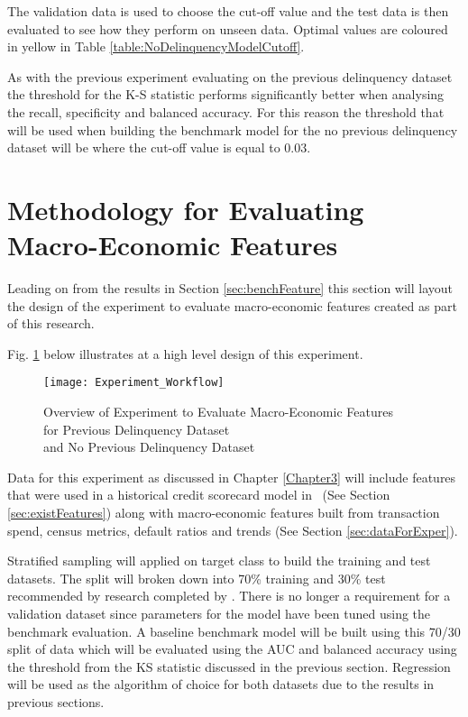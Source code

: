 The validation data is used to choose the cut-off value and the test data is then evaluated to see how they perform on unseen data. Optimal values are coloured in yellow in Table \ref{table:NoDelinquencyModelCutoff}.

As with the previous experiment evaluating on the previous delinquency dataset the threshold for the K-S statistic performs significantly better when analysing the recall, specificity and balanced accuracy. For this reason  the threshold that will be used when building the benchmark model for the no previous delinquency dataset will be where the cut-off value is equal to 0.03.

\section{Methodology for Evaluating Macro-Economic Features}
Leading on from the results in Section \ref{sec:benchFeature} this section will layout the design of the experiment to evaluate macro-economic features created as part of this research. 
 
Fig. \ref{fig:Experiment_Workflow} below illustrates at a high level design of this experiment. 

\begin{figure}[H]
	\texttt{[image: Experiment\_Workflow]}
	\caption{Overview of Experiment to Evaluate Macro-Economic Features \\
		for Previous Delinquency Dataset \\
		and No Previous Delinquency Dataset}
	\label{fig:Experiment_Workflow}
\end{figure}


Data for this experiment as discussed in Chapter \ref{Chapter3} will include features that were used in a historical credit scorecard model in \subjectname\ (See Section \ref{sec:existFeatures}) along with macro-economic features built from transaction spend, census metrics, default ratios and trends (See Section \ref{sec:dataForExper}). 

Stratified sampling will applied on target class to build the training and test datasets. The split will broken down into 70\% training and 30\% test recommended by research completed by \cite{siddiqi_credit_2012}. There is no longer a requirement for a validation dataset since parameters for the model have been tuned using the benchmark evaluation. A baseline benchmark model will be built using this 70/30 split of data which will be evaluated using the AUC and balanced accuracy using the threshold from the KS statistic discussed in the previous section. Regression will be used as the algorithm of choice for both datasets due to the results in previous sections.


